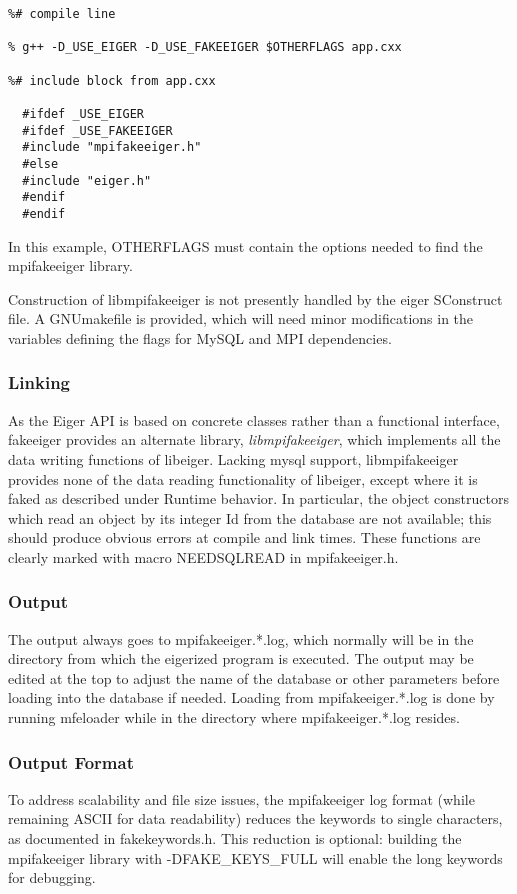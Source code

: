 \begin{verbatim} 
%# compile line

% g++ -D_USE_EIGER -D_USE_FAKEEIGER $OTHERFLAGS app.cxx

%# include block from app.cxx

  #ifdef _USE_EIGER
  #ifdef _USE_FAKEEIGER
  #include "mpifakeeiger.h"
  #else
  #include "eiger.h"
  #endif
  #endif
\end{verbatim}

In this example, OTHERFLAGS must contain the options needed to find the mpifakeeiger library.

Construction of libmpifakeeiger is not presently handled by the eiger SConstruct file. A
GNUmakefile is provided, which will need minor modifications in the variables defining the
flags for MySQL and MPI dependencies.

\subsubsection{Linking} As the Eiger API is based on concrete classes rather than a functional interface, fakeeiger provides an alternate library, {\em libmpifakeeiger}, which implements all the data writing functions of libeiger. Lacking mysql support, libmpifakeeiger provides none of the data reading functionality of libeiger, except where it is faked as described under Runtime behavior. In particular, the object constructors which read an object by its integer Id from the database are not available; this should produce obvious errors at compile and link times. These functions are clearly marked with macro NEEDSQLREAD in mpifakeeiger.h.

\subsubsection{Output} The output always goes to mpifakeeiger.*.log, which normally will be in the directory from which the eigerized program is executed. The output may be edited at the top to adjust the name of the database or other parameters before loading into the database if needed. Loading from mpifakeeiger.*.log is done by running mfeloader while in the directory where mpifakeeiger.*.log resides.

\subsubsection{Output Format} To address scalability and file size issues, the mpifakeeiger log format (while remaining ASCII for data readability) reduces the keywords to single characters, as documented in fakekeywords.h. This reduction is optional: building the mpifakeeiger library with -DFAKE\_KEYS\_FULL will enable the long keywords for debugging.


